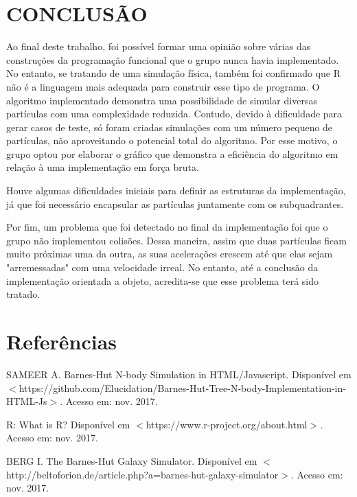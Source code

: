 \documentclass[rel_mlp]{iiufrgs}
\begin{document}
%
\chapter{CONCLUSÃO}

Ao final deste trabalho, foi possível formar uma opinião sobre várias das construções da programação funcional que o grupo nunca havia implementado. No entanto, se tratando de uma simulação física, também foi confirmado que R não é a linguagem mais adequada para construir esse tipo de programa.
O algoritmo implementado demonstra uma possibilidade de simular diversas partículas com uma complexidade reduzida. Contudo, devido à dificuldade para gerar casos de teste, só foram criadas simulações com um número pequeno de partículas, não aproveitando o potencial total do algoritmo. Por esse motivo, o grupo optou por elaborar o gráfico que demonstra a eficiência do algoritmo em relação à uma implementação em força bruta.

Houve algumas dificuldades iniciais para definir as estruturas da implementação, já que foi necessário encapsular
as partículas juntamente com os subquadrantes.

Por fim, um problema que foi detectado no final da implementação foi que o grupo não implementou colisões.
Dessa maneira, assim que duas partículas ficam muito próximas uma da outra, as suas acelerações crescem até que elas sejam "arremessadas" com uma velocidade irreal. No entanto, até a conclusão da implementação
orientada a objeto, acredita-se que esse problema terá sido tratado.



%
\chapter{Referências}




\noindent SAMEER A. Barnes-Hut N-body Simulation in HTML/Javascript. Disponível em $<$https://github.com/Elucidation/Barnes-Hut-Tree-N-body-Implementation-in-HTML-Js$>$. Acesso em: nov. 2017.

\noindent R: What is R? Disponível em $<$https://www.r-project.org/about.html$>$. Acesso em: nov. 2017.

\noindent BERG I. The Barnes-Hut Galaxy Simulator. Disponível em $<$http://beltoforion.de/article.php?a=barnes-hut-galaxy-simulator$>$. Acesso em: nov. 2017.
\end{document}
